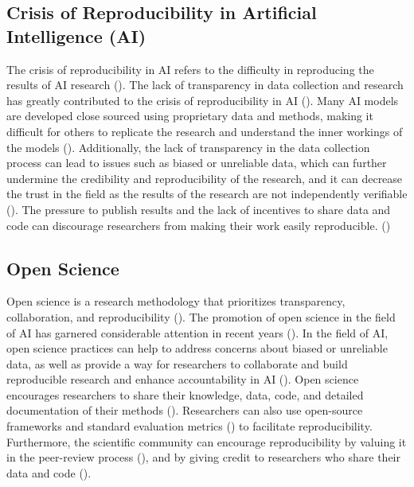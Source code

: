 \documentclass{article}
\begin{document}
\subsection{Crisis of Reproducibility in Artificial Intelligence (AI)}
The crisis of reproducibility in AI refers to the difficulty in reproducing the results of AI research (\cite{gundersen2018reproducible}). The lack of transparency in data collection and research has greatly contributed to the crisis of reproducibility in AI (\cite{gundersen2018reproducible,hutson2018artificial,leakage-recrisis}). Many AI models are developed close sourced using proprietary data and methods, making it difficult for others to replicate the research and understand the inner workings of the models (\cite{gundersen2018reproducible,accountabilityInAi}). Additionally, the lack of transparency in the data collection process can lead to issues such as biased or unreliable data, which can further undermine the credibility and reproducibility of the research, and it can decrease the trust in the field as the results of the research are not independently verifiable  (\cite{accountabilityInAi,leakage-recrisis,scully-debt-ml}). The pressure to publish results and the lack of incentives to share data and code can discourage researchers from making their work easily reproducible. (\cite{psychology-reproducibility-crisis, friesike2015open,kwon2021incentive, ali2017motivating,o2017evaluation})


\subsection{Open Science}

Open science is a research methodology that prioritizes transparency, collaboration, and reproducibility (\cite{nielsen2011reinventing}). The promotion of open science in the field of AI has garnered considerable attention in recent years (\cite{accountabilityInAi, gundersen2018reproducible, leakage-recrisis, scully-debt-ml, stodden-towardreprodicibleresearch, coro2020open, braun2018open, hicks2021open, burgelman2019open}). In the field of AI, open science practices can help to address concerns about biased or unreliable data, as well as provide a way for researchers to collaborate and build reproducible research and enhance accountability in AI (\cite{accountabilityInAi, stodden-towardreprodicibleresearch}).  Open science encourages researchers to share their knowledge, data, code, and detailed documentation of their methods (\cite{hutson2018artificial,accountabilityInAi}). 
Researchers can also use open-source frameworks and standard evaluation metrics (\cite{gundersen2018reproducible}) to facilitate reproducibility. Furthermore, the scientific community can encourage reproducibility by valuing it in the peer-review process (\cite{scully-debt-ml}), and by giving credit to researchers who share their data and code (\cite{scully-debt-ml,credit-datasharing,stodden-towardreprodicibleresearch}).
\end{document}
